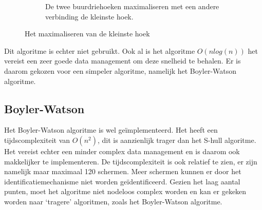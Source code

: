 \begin{figure}
\begin{subfigure}{0.4\textwidth}
		\caption{De twee buurdriehoeken maximaliseren met een andere verbinding de kleinste hoek.}
	\end{subfigure}
	\caption{Het maximaliseren van de kleinste hoek \cite{delaunaywiki}}
	\label{driehoekswitch}
\end{figure}

Dit algoritme is echter niet gebruikt. Ook al is het algoritme $O(nlog(n))$ het vereist een zeer goede data management om deze snelheid te behalen.  \cite{Lund2014} Er is daarom gekozen voor een simpeler algoritme, namelijk het Boyler-Watson algoritme.

\subsection{Boyler-Watson}
Het Boyler-Watson algoritme is wel geïmplementeerd. Het heeft een tijdscomplexiteit van $O(n^2)$, dit is aanzienlijk trager dan het S-hull algoritme. \cite{Bowyer-WatsonWiki} Het vereist echter een minder complex data management en is daarom ook makkelijker te implementeren. De tijdscomplexiteit is ook relatief te zien, er zijn namelijk maar maximaal 120 schermen. Meer schermen kunnen er door het identificatiemechanisme niet worden geïdentificeerd. Gezien het laag aantal punten, moet het algoritme niet nodeloos complex worden en kan er gekeken worden naar `tragere' algoritmen, zoals het Boyler-Watson algoritme.

\paragraph{}
